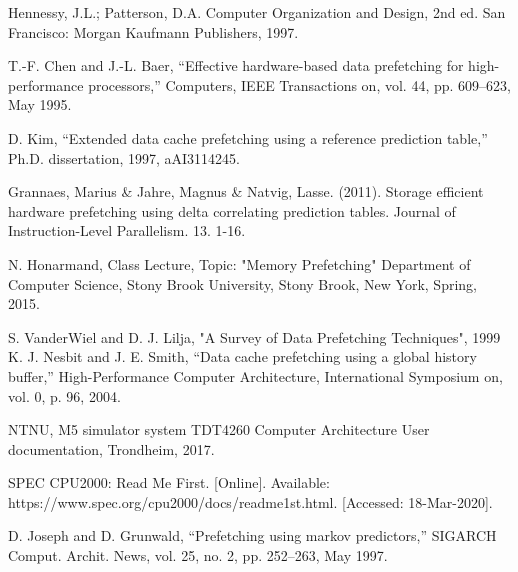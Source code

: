 \begin{thebibliography}{00}


Hennessy, J.L.; Patterson, D.A. Computer Organization and Design, 2nd ed. San Francisco: Morgan Kaufmann Publishers, 1997.

T.-F. Chen and J.-L. Baer, “Effective hardware-based data prefetching
for high-performance processors,” Computers, IEEE Transactions on,
vol. 44, pp. 609–623, May 1995.

D. Kim, “Extended data cache prefetching using a reference prediction table,” Ph.D. dissertation, 1997, aAI3114245.

Grannaes, Marius \& Jahre, Magnus \& Natvig, Lasse. (2011). Storage efficient hardware prefetching using delta correlating prediction tables. Journal of Instruction-Level Parallelism. 13. 1-16.



  
 N. Honarmand, Class Lecture, Topic: "Memory Prefetching" Department of Computer Science, Stony Brook University, Stony Brook, New York, Spring, 2015.

  S. VanderWiel and D. J. Lilja, "A Survey of Data Prefetching Techniques", 1999
K. J. Nesbit and J. E. Smith, “Data cache prefetching using a global
history buffer,” High-Performance Computer Architecture, International
Symposium on, vol. 0, p. 96, 2004.

NTNU, M5 simulator system TDT4260 Computer Architecture User documentation, 
Trondheim, 2017.

SPEC CPU2000: Read Me First. [Online]. Available: https://www.spec.org/cpu2000/docs/readme1st.html. [Accessed: 18-Mar-2020].

D. Joseph and D. Grunwald, “Prefetching using markov predictors,”
SIGARCH Comput. Archit. News, vol. 25, no. 2, pp. 252–263, May
1997.




\end{thebibliography}